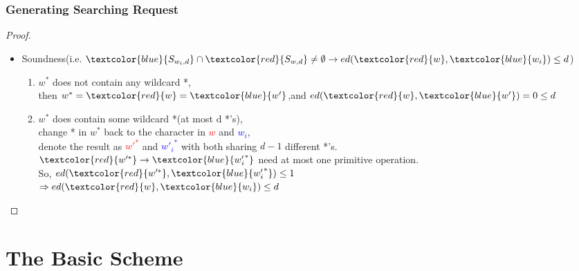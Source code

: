 \documentclass[handout]{beamer}
\begin{document}
\begin{frame}
	\frametitle{Generating Searching Request}
	\begin{proof}
		\begin{itemize}
			\item Soundness(i.e. $\textcolor{blue}{S_{{w_i},d}} \cap \textcolor{red}{S_{w,d}} \ne \emptyset  \to ed(\textcolor{red}{w},\textcolor{blue}{w_i}) \le d$) \\
			\begin{enumerate}
				\item<3-> ${w^*}$ does not contain any wildcard *,\\
				then ${w^*} =\textcolor{red}{ w} =\textcolor{blue}{ w'}$,and $ed(\textcolor{red}{w},\textcolor{blue}{w'}) = 0 \le d$
				\item<4-> ${w^*}$ does contain some wildcard *(at most d *'s),\\
				change * in $w^*$ back to the character in \textcolor{red}{$w$} and \textcolor{blue}{$w_i$},\\
				denote the result as \textcolor{red}{$w{'^*}$} and \textcolor{blue}{$w{'_i}^*$} with both sharing $d-1$ different *'s.\\
				$\textcolor{red}{w{'^*}} \to \textcolor{blue}{w{'_i}^*}$ need at most one primitive operation.\\
				So, $ed(\textcolor{red}{w{'^*}},\textcolor{blue}{w{'_i}^*}) \le 1$\\
				$ \Rightarrow ed(\textcolor{red}{w},\textcolor{blue}{{w_i}}) \le d$
				
			\end{enumerate}
		\end{itemize}
	\end{proof}
\end{frame}

\section{The Basic Scheme}
\end{document}
